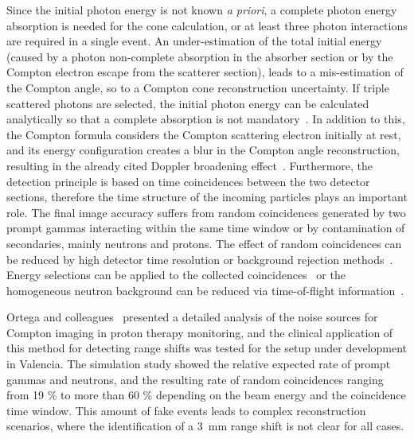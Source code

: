Since the initial photon energy is not known \textit{a priori}, a complete photon energy absorption is needed for the cone calculation, or at least three photon interactions are required in a single event. An under-estimation of the total initial energy (caused by a photon non-complete absorption in the absorber section or by the Compton electron escape from the scatterer section), leads to a mis-estimation of the Compton angle, so to a Compton cone reconstruction uncertainty. If triple scattered photons are selected, the initial photon energy can be calculated analytically so that a complete absorption is not mandatory~\parencite{Kurfess2000}. In addition to this, the Compton formula considers the Compton scattering electron initially at rest, and its energy configuration creates a blur in the Compton angle reconstruction, resulting in the already cited Doppler broadening effect~\parencite{Ordonez1997}. Furthermore, the detection principle is based on time coincidences between the two detector sections, therefore the time structure of the incoming particles plays an important role. The final image accuracy suffers from random coincidences generated by two prompt gammas interacting within the same time window or by contamination of secondaries, mainly neutrons and protons. The effect of random coincidences can be reduced by high detector time resolution or background rejection methods~\parencite{Draeger2017}. Energy selections can be applied to the collected coincidences~\parencite{Polf2009, Hilaire2016} or the homogeneous neutron background can be reduced via time-of-flight information~\parencite{Testa2010}.

Ortega and colleagues~\parencite{Ortega2015} presented a detailed analysis of the noise sources for Compton imaging in proton therapy monitoring, and the clinical application of this method for detecting range shifts was tested for the setup under development in Valencia. The simulation study showed the relative expected rate of prompt gammas and neutrons, and the resulting rate of random coincidences ranging from 19 \% to more than 60 \% depending on the beam energy and the coincidence time window. This amount of fake events leads to complex reconstruction scenarios, where the identification of a 3~mm range shift is not clear for all cases.

